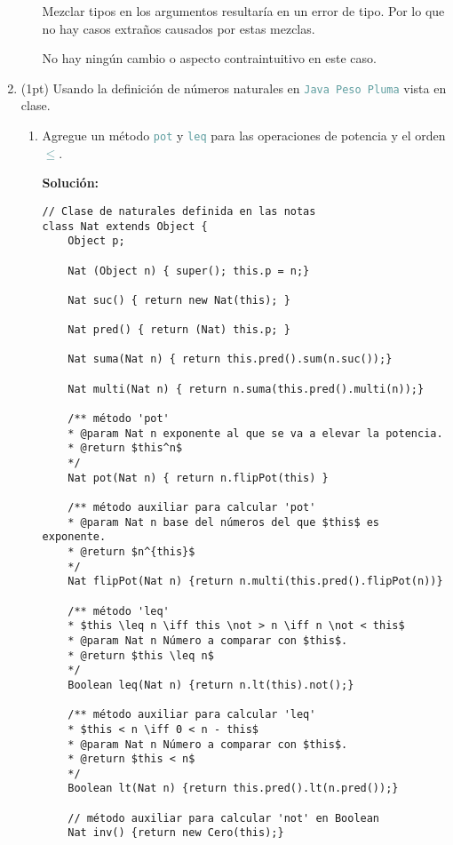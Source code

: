 \documentclass{article}
\newcommand{\tp}[1]{\textcolor{CadetBlue} {\texttt{#1}}}
\newcommand{\tb}[1]{\textcolor{RoyalPurple} {\textbf{#1}}}
\newcommand{\pt}[1]{\textcolor{RoyalPurple}{(#1pt)}}
\begin{document}
\begin{enumerate}
\begin{itemize}
            Mezclar tipos en los argumentos resultaría en un error de tipo. Por
            lo que no hay casos extraños causados por estas mezclas.

            No hay ningún cambio o aspecto contraintuitivo en este caso.

        \end{itemize}

        \item \pt{1} Usando la definición de números naturales en
        \tp{Java Peso Pluma} vista en clase.

        \begin{enumerate}
            \item Agregue un método \tp{pot} y \tp{leq} para las operaciones de
            potencia y el orden \tp{$\leq$}.

            \tb{Solución:}

            \begin{verbatim}
// Clase de naturales definida en las notas
class Nat extends Object {
    Object p;

    Nat (Object n) { super(); this.p = n;}

    Nat suc() { return new Nat(this); }

    Nat pred() { return (Nat) this.p; }

    Nat suma(Nat n) { return this.pred().sum(n.suc());}

    Nat multi(Nat n) { return n.suma(this.pred().multi(n));}

    /** método 'pot'
    * @param Nat n exponente al que se va a elevar la potencia.
    * @return $this^n$
    */
    Nat pot(Nat n) { return n.flipPot(this) }

    /** método auxiliar para calcular 'pot'
    * @param Nat n base del números del que $this$ es exponente.
    * @return $n^{this}$
    */
    Nat flipPot(Nat n) {return n.multi(this.pred().flipPot(n))}

    /** método 'leq'
    * $this \leq n \iff this \not > n \iff n \not < this$
    * @param Nat n Número a comparar con $this$.
    * @return $this \leq n$
    */
    Boolean leq(Nat n) {return n.lt(this).not();}

    /** método auxiliar para calcular 'leq'
    * $this < n \iff 0 < n - this$
    * @param Nat n Número a comparar con $this$.
    * @return $this < n$
    */
    Boolean lt(Nat n) {return this.pred().lt(n.pred());}

    // método auxiliar para calcular 'not' en Boolean
    Nat inv() {return new Cero(this);}


\end{verbatim}
\end{enumerate}
\end{enumerate}
\end{document}
